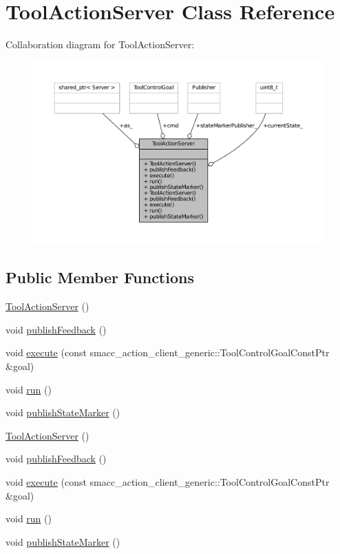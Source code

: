 \hypertarget{classToolActionServer}{}\section{Tool\+Action\+Server Class Reference}
\label{classToolActionServer}


Collaboration diagram for Tool\+Action\+Server\+:
\nopagebreak
\begin{figure}[H]
\begin{center}
\leavevmode
\includegraphics[width=350pt]{classToolActionServer__coll__graph}
\end{center}
\end{figure}
\subsection*{Public Member Functions}
\begin{DoxyCompactItemize}
\item 
\hyperlink{classToolActionServer_a780b72c834c95d45941ff6374c03c1c6}{Tool\+Action\+Server} ()
\item 
void \hyperlink{classToolActionServer_afe566312095ca250bc32f98a11774f2b}{publish\+Feedback} ()
\item 
void \hyperlink{classToolActionServer_a34bd6fce77510778d5a51385afeb36bb}{execute} (const smacc\+\_\+action\+\_\+client\+\_\+generic\+::\+Tool\+Control\+Goal\+Const\+Ptr \&goal)
\item 
void \hyperlink{classToolActionServer_adbf39061e0f8c74352cbdc695d7d8469}{run} ()
\item 
void \hyperlink{classToolActionServer_aef01c70e358c933855db3a37b46a3740}{publish\+State\+Marker} ()
\item 
\hyperlink{classToolActionServer_a780b72c834c95d45941ff6374c03c1c6}{Tool\+Action\+Server} ()
\item 
void \hyperlink{classToolActionServer_afe566312095ca250bc32f98a11774f2b}{publish\+Feedback} ()
\item 
void \hyperlink{classToolActionServer_a34bd6fce77510778d5a51385afeb36bb}{execute} (const smacc\+\_\+action\+\_\+client\+\_\+generic\+::\+Tool\+Control\+Goal\+Const\+Ptr \&goal)
\item 
void \hyperlink{classToolActionServer_adbf39061e0f8c74352cbdc695d7d8469}{run} ()
\item 
void \hyperlink{classToolActionServer_aef01c70e358c933855db3a37b46a3740}{publish\+State\+Marker} ()
\end{DoxyCompactItemize}
